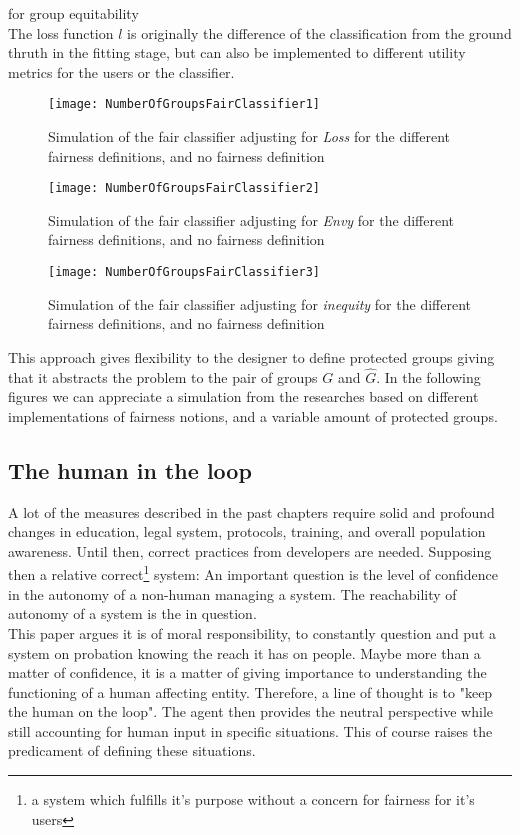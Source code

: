 for group equitability\\
The loss function $l$ is originally the difference of the classification from the ground thruth in the fitting stage, but can also be implemented to different utility metrics for the users or the classifier.
\begin{figure}[h]
  \centering
  \begin{minipage}[b]{0.35\textwidth}
    \texttt{[image: NumberOfGroupsFairClassifier1]}
    \caption{Simulation of the fair classifier adjusting for \textsl{Loss} for the different fairness definitions, and no fairness definition}
    \cite{FairClassifier}
  \end{minipage}
  \hfill
  \begin{minipage}[b]{0.35\textwidth}
    \texttt{[image: NumberOfGroupsFairClassifier2]}
    \caption{Simulation of the fair classifier adjusting for \textsl{Envy} for the different fairness definitions, and no fairness definition}
    \cite{FairClassifier}
  \end{minipage}
  \centering
    \texttt{[image: NumberOfGroupsFairClassifier3]}
    \caption{Simulation of the fair classifier adjusting for \textsl{inequity} for the different fairness definitions, and no fairness definition}
    \cite{FairClassifier}
\end{figure}

This approach gives flexibility to the designer to define protected groups giving that it abstracts the problem to the pair of groups $G$ and $\hat G$. In the following figures we can appreciate a simulation from the researches based on different implementations of fairness notions, and a variable amount of protected groups.
\subsection{The human in the loop}
A lot of the measures described in the past chapters require solid and profound changes in education, legal system, protocols, training, and overall population awareness. Until then, correct practices from developers are needed. Supposing then a relative correct\footnote{a system which fulfills it's purpose without a concern for fairness for it's users} system:
An important question is the level of confidence in the autonomy of a non-human managing a system. The reachability of autonomy of a system is the in question.\\ This paper argues it is of moral responsibility, to constantly question and put a system on probation knowing the reach it has on people. Maybe more than a matter of confidence, it is a matter of giving importance to understanding the functioning of a human affecting entity. Therefore, a line of thought is to "keep the human on the loop". The agent then provides the neutral perspective while still accounting for human input in specific situations. This of course raises the predicament of defining these situations.

